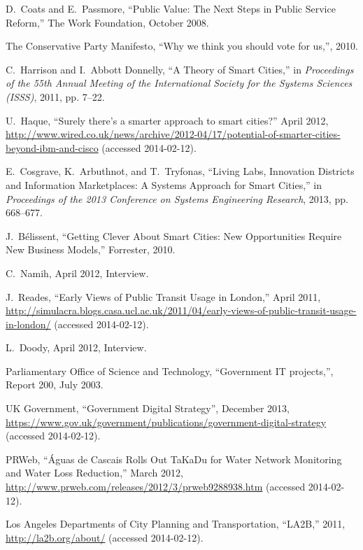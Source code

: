 \documentclass[conference]{IEEEtran}
\begin{document}
\begin{thebibliography}{99}
D.~Coats and E.~Passmore, ``{Public Value: The Next Steps in Public Service
  Reform},'' {The Work Foundation}, October 2008.

{The Conservative Party Manifesto}, ``{Why we think you should vote for us},'', 2010.

C.~Harrison and I.~{Abbott Donnelly}, ``{A Theory of Smart Cities},'' in
  \emph{{Proceedings of the 55th Annual Meeting of the International Society
  for the Systems Sciences (ISSS)}}, 2011, pp. 7--22.

U.~Haque, ``Surely there's a smarter approach to smart cities?'' April 2012,
  \url{http://www.wired.co.uk/news/archive/2012-04/17/potential-of-smarter-cities-beyond-ibm-and-cisco}
  (accessed 2014-02-12).

E.~Cosgrave, K.~Arbuthnot, and T.~Tryfonas, ``{Living Labs, Innovation
  Districts and Information Marketplaces: A Systems Approach for Smart
  Cities},'' in \emph{Proceedings of the 2013 Conference on Systems Engineering
  Research}, 2013, pp. 668--677.

J.~B\'{e}lissent, ``{Getting Clever About Smart Cities: New Opportunities
  Require New Business Models},'' {Forrester}, 2010.

C.~Namih, April 2012, {Interview}.

J.~Reades, ``{Early Views of Public Transit Usage in London},'' April 2011,
  \url{http://simulacra.blogs.casa.ucl.ac.uk/2011/04/early-views-of-public-transit-usage-in-london/}
  (accessed 2014-02-12).

L.~Doody, April 2012, {Interview}.

{Parliamentary Office of Science and Technology}, ``{Government IT
  projects},'', Report 200, July 2003.

{UK Government}, ``{Government Digital Strategy}'', December 2013, \url{https://www.gov.uk/government/publications/government-digital-strategy}
  (accessed 2014-02-12).

{PRWeb}, ``{\'{A}guas de Cascais Rolls Out TaKaDu for Water Network Monitoring
  and Water Loss Reduction},'' March 2012,
  \url{http://www.prweb.com/releases/2012/3/prweb9288938.htm} (accessed
  2014-02-12).

{Los Angeles Departments of City Planning and Transportation}, ``{LA2B},''
  2011, \url{http://la2b.org/about/} (accessed 2014-02-12).


\end{thebibliography}
\end{document}
